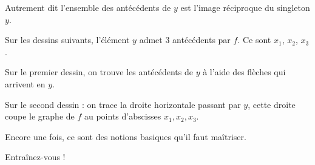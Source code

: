 Autrement dit l'ensemble des antécédents de $y$ est l'image réciproque du singleton $y$.

Sur les dessins suivants, l'élément $y$ admet $3$ antécédents par $f$. 
Ce sont $x_1$, $x_2$, $x_3$.

Sur le premier dessin, on trouve les antécédents de $y$ à l'aide des flèches qui arrivent en $y$.

Sur le second dessin : on trace la droite horizontale passant par $y$, cette droite
coupe le graphe de $f$ au points d'abscisses $x_1, x_2, x_3$.



\diapo

Encore une fois, ce sont des notions basiques qu'il faut maîtriser.

Entraînez-vous !


